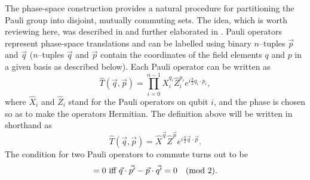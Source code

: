 \documentclass[aps,twocolumn,showpacs,nofootinbib,superscriptaddress]{revtex4}
\begin{document}
The phase-space construction provides a natural procedure for
partitioning the Pauli group into disjoint, mutually commuting
sets. The idea, which is worth reviewing here, was described in
\cite{GibbonsHW04} and further elaborated in \cite{PazRS04b}.
Pauli operators represent phase-space translations and can be
labelled using binary $n$--tuples $\vec{p}$ and $\vec{q}$
($n$--tuples $\vec{q}$ and $\vec{p}$ contain the coordinates of
the field elements $q$ and $p$ in a given basis as described
below). Each Pauli operator can be written as
\begin{equation}
\hat{T}(\vec q,\vec p) = \prod_{i=0}^{n-1}\hat{X}_i^{q_i}\hat{Z}_i^{p_i}e^{i\frac{\pi}{2}q_i \cdot p_i},
\end{equation}
where $\hat{X}_i$ and $\hat{Z}_i$ stand for the Pauli operators on qubit $i$, and the phase is chosen so as to make the operators Hermitian. The definition above will be written in shorthand as
\begin{equation}
\hat{T}(\vec q,\vec p) =  \hat{X}^{\vec q} \hat{Z}^{\vec p} e^{i
\frac{\pi}{2} \vec {q} \cdot \vec {p}}.
\end{equation}
The condition for two Pauli operators to commute turns out to be
\begin{equation}
[\hat{T}(\vec q,\vec p),\hat{T}(\vec {q^\prime},\vec {p^\prime})]=0 \text{ iff }
\vec{q}\cdot\vec{p^\prime}-\vec{p}\cdot\vec{q^\prime}=0 \quad ({\rm mod} ~2). \label{eqcomrel}
\end{equation}
\end{document}
